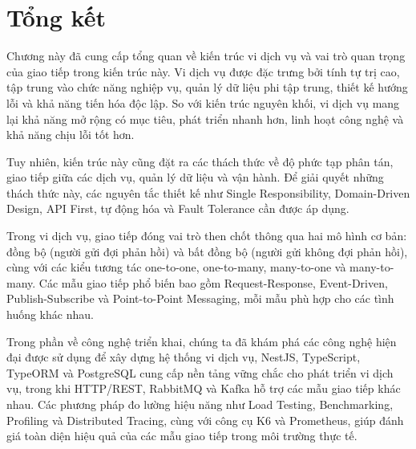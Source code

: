 \section{Tổng kết}

Chương này đã cung cấp tổng quan về kiến trúc vi dịch vụ và vai trò quan trọng của giao tiếp trong kiến trúc này. Vi dịch vụ được đặc trưng bởi tính tự trị cao, tập trung vào chức năng nghiệp vụ, quản lý dữ liệu phi tập trung, thiết kế hướng lỗi và khả năng tiến hóa độc lập. So với kiến trúc nguyên khối, vi dịch vụ mang lại khả năng mở rộng có mục tiêu, phát triển nhanh hơn, linh hoạt công nghệ và khả năng chịu lỗi tốt hơn.

Tuy nhiên, kiến trúc này cũng đặt ra các thách thức về độ phức tạp phân tán, giao tiếp giữa các dịch vụ, quản lý dữ liệu và vận hành. Để giải quyết những thách thức này, các nguyên tắc thiết kế như Single Responsibility, Domain-Driven Design, API First, tự động hóa và Fault Tolerance cần được áp dụng.

Trong vi dịch vụ, giao tiếp đóng vai trò then chốt thông qua hai mô hình cơ bản: đồng bộ (người gửi đợi phản hồi) và bất đồng bộ (người gửi không đợi phản hồi), cùng với các kiểu tương tác one-to-one, one-to-many, many-to-one và many-to-many. Các mẫu giao tiếp phổ biến bao gồm Request-Response, Event-Driven, Publish-Subscribe và Point-to-Point Messaging, mỗi mẫu phù hợp cho các tình huống khác nhau.

Trong phần về công nghệ triển khai, chúng ta đã khám phá các công nghệ hiện đại được sử dụng để xây dựng hệ thống vi dịch vụ, NestJS, TypeScript, TypeORM và PostgreSQL cung cấp nền tảng vững chắc cho phát triển vi dịch vụ, trong khi HTTP/REST, RabbitMQ và Kafka hỗ trợ các mẫu giao tiếp khác nhau. Các phương pháp đo lường hiệu năng như Load Testing, Benchmarking, Profiling và Distributed Tracing, cùng với công cụ K6 và Prometheus, giúp đánh giá toàn diện hiệu quả của các mẫu giao tiếp trong môi trường thực tế.